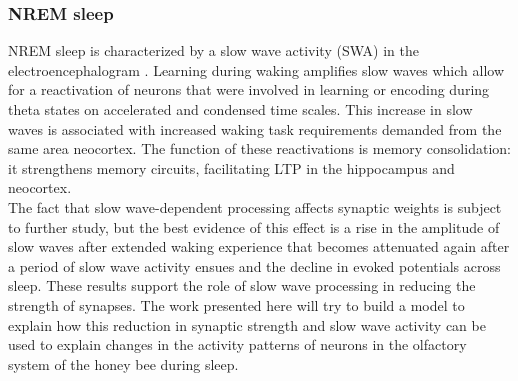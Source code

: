     \subsubsection{NREM sleep}
    NREM sleep is characterized by a slow wave activity (SWA) in the electroencephalogram \cite{nrem-review}.
    Learning during waking amplifies slow waves which allow for a reactivation of neurons that were involved in learning or encoding during theta states on accelerated and condensed time scales.
    This increase in slow waves is associated with increased waking task requirements demanded from the same area neocortex.
    The function of these reactivations is memory consolidation: it strengthens memory circuits, facilitating LTP in the hippocampus and neocortex.\\
    The fact that slow wave-dependent processing affects synaptic weights is subject to further study, but the best evidence of this effect is a rise in the amplitude of slow waves after extended waking experience that becomes attenuated again after a period of slow wave activity ensues and the decline in evoked potentials across sleep.
    These results support the role of slow wave processing in reducing the strength of synapses.
    The work presented here will try to build a model to explain how this reduction in synaptic strength and slow wave activity can be used to explain changes in the activity patterns of neurons in the olfactory system of the honey bee during sleep.

